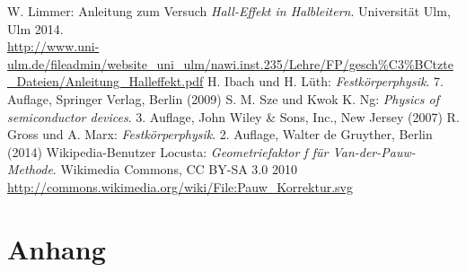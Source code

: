 \documentclass[a4paper, parskip=half, 12pt, bibliography=totocnumbered]{scrartcl}
\begin{document}





\begin{thebibliography}{10}
 W. Limmer: Anleitung zum Versuch \emph{Hall-Effekt in Halbleitern}. Universität Ulm, Ulm 2014.\\
\url{http://www.uni-ulm.de/fileadmin/website_uni_ulm/nawi.inst.235/Lehre/FP/gesch%C3%BCtzte_Dateien/Anleitung_Halleffekt.pdf}
 H. Ibach und H. Lüth: \emph{Festkörperphysik}. 7. Auflage, Springer Verlag, Berlin (2009)
 S. M. Sze und Kwok K. Ng: \emph{Physics of semiconductor devices}. 3. Auflage, John Wiley \& Sons, Inc., New Jersey (2007)
 R. Gross und A. Marx: \emph{Festkörperphysik}. 2. Auflage, Walter de Gruyther, Berlin (2014)
 Wikipedia-Benutzer Locusta: \emph{Geometriefaktor f für Van-der-Pauw-Methode}. Wikimedia Commons, CC BY-SA 3.0 2010\\ \url{http://commons.wikimedia.org/wiki/File:Pauw_Korrektur.svg}
\end{thebibliography}

\newpage
\section{Anhang}
\begin{addmargin}[-3em]{3em}

\end{addmargin}
\end{document}
